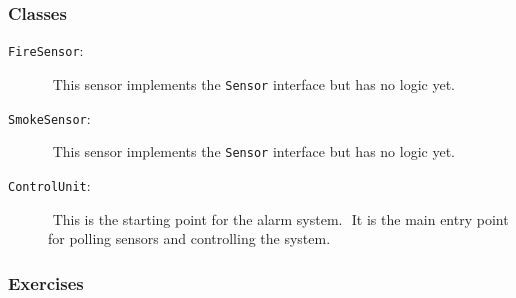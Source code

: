 \documentclass[12pt,a4paper,times]{exam}
\begin{document}
\subsubsection*{Classes}
\begin{description}
	\item[\texttt{FireSensor}:]  This sensor implements the \verb!Sensor! interface but has no logic yet.
	\item[\texttt{SmokeSensor}:]  This sensor implements the \verb!Sensor! interface but has no logic yet.
	\item[\texttt{ControlUnit}:]  This is the starting point for the alarm system.  It is the main entry point for polling sensors and controlling the system.
\end{description}

\subsubsection*{Exercises}
\end{document}
